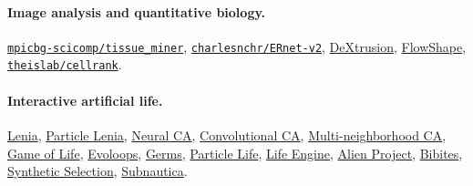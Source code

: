 \documentclass[11pt]{article}
\newcommand{\ghrepo}[2]{\href{https://github.com/#1/#2}{\texttt{#1/\allowbreak#2}}}
\begin{document}
\paragraph{Image analysis and quantitative biology.}
\ghrepo{mpicbg-scicomp}{tissue_miner},
\ghrepo{charlesnchr}{ERnet-v2},
\href{https://gitlab.pasteur.fr/gletort/dextrusion}{DeXtrusion},
\href{https://bitbucket.org/pgmsembryogenesis/flowshape}{FlowShape},
\ghrepo{theislab}{cellrank}.

\paragraph{Interactive artificial life.}
\href{https://evolvecode.io/alife/lenia.html}{Lenia},
\href{https://znah.net/lenia/}{Particle Lenia},
\href{https://distill.pub/2020/growing-ca/}{Neural CA},
\href{https://neuralpatterns.io/}{Convolutional CA},
\href{https://www.youtube.com/c/slackermanz}{Multi-neighborhood CA},
\href{https://evolvecode.io/alife/gol.html}{Game of Life},
\href{https://evolvecode.io/alife/evoloop.html}{Evoloops},
\href{https://evolvecode.io/alife/aquarium.html}{Germs},
\href{https://sandbox-science.com/particle-life}{Particle Life},
\href{https://thelifeengine.net/}{Life Engine},
\href{https://www.alien-project.org/index.html}{Alien Project},
\href{https://store.steampowered.com/app/2736860/}{Bibites},
\href{https://www.youtube.com/watch?v=iNXzOuc9UWo}{Synthetic Selection},
\href{https://store.steampowered.com/app/264710/}{Subnautica}.
\end{document}
